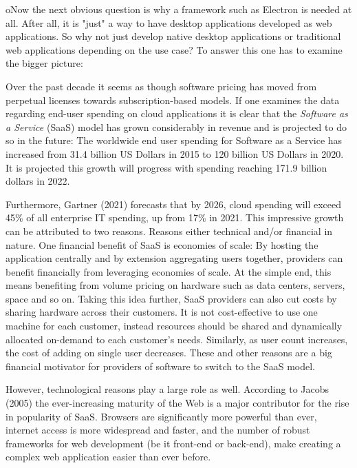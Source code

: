 oNow the next obvious question is why a framework such as Electron is needed at all.
After all, it is "just" a way to have desktop applications developed as web applications.
So why not just develop native desktop applications or traditional web applications depending on the use case?
To answer this one has to examine the bigger picture:\par
Over the past decade it seems as though software pricing has moved from perpetual licenses towards subscription-based
models.
If one examines the data regarding end-user spending on cloud applications it is clear that the
\emph{Software as a Service} (SaaS) model has grown considerably in revenue and is projected to do so in the future:
The worldwide end user spending for Software as a Service has increased from 31.4 billion US Dollars in 2015 to 120
billion US Dollars in 2020.
It is projected this growth will progress with spending reaching 171.9 billion dollars in 2022.\cite{gartner2021}\par
Furthermore, Gartner (2021) forecasts that by 2026, cloud spending will exceed 45\% of all enterprise IT spending, up from
17\% in 2021.
This impressive growth can be attributed to two reasons.
Reasons either technical and/or financial in nature.
One financial benefit of SaaS is economies of scale:
By hosting the application centrally and by extension aggregating users together, providers can benefit financially from
leveraging economies of scale.
At the simple end, this means benefiting from volume pricing on hardware such as data centers, servers, space and so on.
Taking this idea further, SaaS providers can also cut costs by sharing hardware across their customers.
It is not cost-effective to use one machine for each customer, instead resources should be shared and dynamically
allocated on-demand to each customer's needs.
Similarly, as user count increases, the cost of adding on single user decreases.
These and other reasons are a big financial motivator for providers of software to switch to the SaaS model.\par
However, technological reasons play a large role as well.
According to Jacobs (2005) the ever-increasing maturity of the Web is a major contributor for the rise in popularity of
SaaS\@.
Browsers are significantly more powerful than ever, internet access is more widespread and faster, and the number
of robust frameworks for web development (be it front-end or back-end), make creating a complex web application easier
than ever before.\cite{akamai2017, statista2021, jacobs2005}
